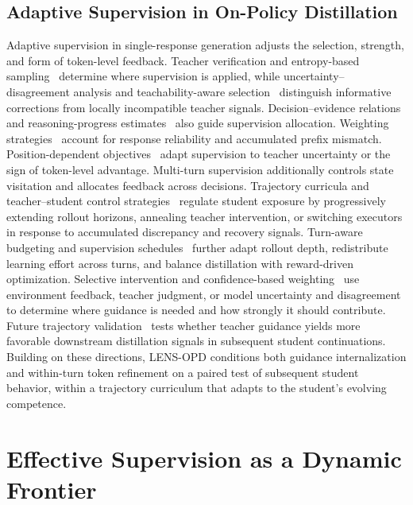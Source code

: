 \documentclass{article}
\newcommand{\authorinput}[1]{\begingroup\sethlcolor{authorHighlight}\hl{[AUTHOR INPUT: #1]}\endgroup}
\begin{document}
\subsection{Adaptive Supervision in On-Policy Distillation}

Adaptive supervision in single-response generation adjusts the selection, strength, and form
of token-level feedback. Teacher verification and entropy-based sampling~\citep{huang2026selectkd,ko2026scaling}
determine where supervision is applied, while uncertainty--disagreement analysis and
teachability-aware selection~\citep{xu2026tip,wang2026not} distinguish informative corrections
from locally incompatible teacher signals. Decision--evidence relations and reasoning-progress
estimates~\citep{xiao2026finding,yang2026beyond} also guide supervision allocation.
Weighting strategies~\citep{li2026filter,xie2026position} account for response reliability
and accumulated prefix mismatch. Position-dependent objectives~\citep{jin2026entropy,jia2026asymmetric}
adapt supervision to teacher uncertainty or the sign of token-level advantage.
Multi-turn supervision additionally controls state visitation and allocates feedback across decisions. Trajectory curricula
and teacher--student control strategies~\citep{wang2026tcod,li2026policy,xia2026dash} regulate
student exposure by progressively extending rollout horizons, annealing teacher intervention,
or switching executors in response to accumulated discrepancy and recovery signals. Turn-aware
budgeting and supervision schedules~\citep{zhou2026turnopd,tan2026atod} further adapt rollout
depth, redistribute learning effort across turns, and balance distillation with reward-driven
optimization. Selective intervention and confidence-based weighting~\citep{zhou2026sage,tan2026atod}
use environment feedback, teacher judgment, or model uncertainty and disagreement to determine
where guidance is needed and how strongly it should contribute. Future trajectory
validation~\citep{chen2026look} tests whether teacher guidance yields more favorable downstream
distillation signals in subsequent student continuations. Building on these directions, LENS-OPD conditions
both guidance internalization and within-turn token refinement on a paired test of subsequent
student behavior, within a trajectory curriculum that adapts to the student's evolving competence.


\section{Effective Supervision as a Dynamic Frontier}
\label{sec:problem}
\end{document}
